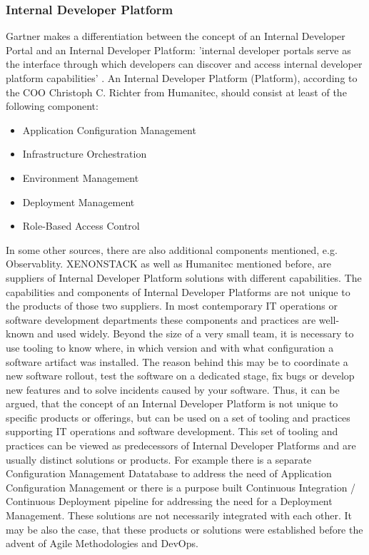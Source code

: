 \documentclass[a4paper,12pt]{article}
\begin{document}
    \subsubsection{Internal Developer Platform}
    Gartner makes a differentiation between the concept of an Internal Developer Portal and an Internal Developer Platform:
    'internal developer portals serve as the interface through which developers can discover and
    access internal developer platform capabilities' \parencite{gartner}.
    An Internal Developer Platform (Platform), according to the COO Christoph C. Richter from Humanitec\parencite{richteretal},
    should consist at least of the following component:
    \begin{itemize}
        \item Application Configuration Management
        \item Infrastructure Orchestration
        \item Environment Management
        \item Deployment Management
        \item Role-Based Access Control
    \end{itemize}
    In some other sources, there are also additional components mentioned, e.g. Observablity\parencite{xenon}.
    XENONSTACK as well as Humanitec mentioned before, are suppliers of Internal Developer Platform solutions with different capabilities.
    The capabilities and components of Internal Developer Platforms are not unique to the products of those two suppliers.
    In most contemporary IT operations or software development departments these components and practices are well-known
    and used widely.
    Beyond the size of a very small team, it is necessary to use tooling to know where, in which version and with what
    configuration a software artifact was installed.
    The reason behind this may be to coordinate a new software rollout, test the software on a dedicated stage, fix bugs
    or develop new features and to solve incidents caused by your software.
    Thus, it can be argued, that the concept of an Internal Developer Platform is not unique to specific products
    or offerings, but can be used on a set of tooling and practices supporting IT operations and software development.
    This set of tooling and practices can be viewed as predecessors of Internal Developer Platforms and are usually
    distinct solutions or products.
    For example there is a separate Configuration Management Datatabase
    to address the need of Application Configuration Management or there is a purpose built Continuous Integration /
    Continuous Deployment pipeline for addressing the need for a Deployment Management.
    These solutions are not necessarily integrated with each other.
    It may be also the case, that these
    products or solutions were established before the advent of Agile Methodologies and DevOps.
\end{document}
